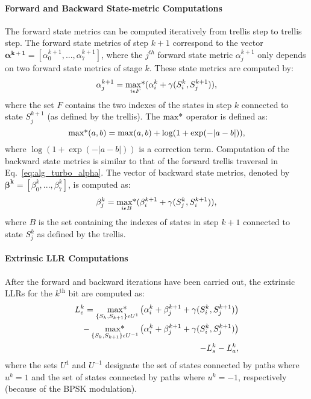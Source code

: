 \paragraph{Forward and Backward State-metric Computations}

The forward state metrics can be computed iteratively from trellis step to
trellis step. The forward state metrics of step $k+1$ correspond to the vector
$\bm{\alpha^{k+1}} = [\alpha_0^{k+1}, ... ,\alpha_7^{k+1}]$, where the
$j^{th}$ forward state metric $\alpha_j^{k+1}$ only depends on two forward
state metrics of stage $k$. These state metrics are computed by:
\begin{equation}
  \label{eq:alg_turbo_alpha}
  \alpha_j^{k+1} =
  \operatorname*{max*}_{i \epsilon F} ( \alpha_i^k + \gamma(S_i^k, S_j^{k+1}) ),
\end{equation}
where the set $F$ contains the two indexes of the states in step $k$ connected
to state $S_j^{k+1}$ (as defined by the trellis). The $\operatorname*{max*}$ operator is
defined as:
\begin{equation}
   \operatorname*{max*}(a,b) = \max(a,b) + \log(1 + \exp(-|a-b|)),
\end{equation}
where $\log(1 + \exp(-|a-b|))$ is a correction term.
Computation of the backward state metrics is similar to that of the forward
trellis traversal in Eq.~\ref{eq:alg_turbo_alpha}. The vector of backward state
metrics, denoted by $\bm{\beta^k} = [\beta_0^k, ..., \beta_7^k]$, is
computed as:
\begin{equation}
  \label{eq:alg_turbo_beta}
  \beta_j^k =
  \operatorname*{max*}_{i \epsilon B} ( \beta_i^{k+1} + \gamma(S_j^k, S_i^{k+1}) ),
\end{equation}
where $B$ is the set containing the indexes of states in step $k+1$ connected to
state $S_j^k$ as defined by the trellis.

\paragraph{Extrinsic LLR Computations}

After the forward and backward iterations have been carried out, the extrinsic
LLRs for the $k^\text{th}$ bit are computed as:
\begin{equation}
  \label{eq:alg_turbo_ext}
  \begin{aligned}
  L_e^k = \operatorname*{max*}_{\{S_k, S_{k+1}\}\epsilon U^1}\big( \alpha_i^k + \beta_j^{k+1} +
  \gamma(S_i^k, S_j^{k+1}) \big) \\
  - \operatorname*{max*}_{\{S_k, S_{k+1}\}\epsilon U^{-1}}\big( \alpha_i^k + \beta_j^{k+1} +
  \gamma(S_i^k, S_j^{k+1}) \big) \\
  - L_{s}^k - L_a^k,
  \end{aligned}
\end{equation}
where the sets $U^1$ and $U^{-1}$ designate the set of states connected by paths
where $u^k=1$ and the set of states connected by paths where $u^k=-1$,
respectively (because of the BPSK modulation).

